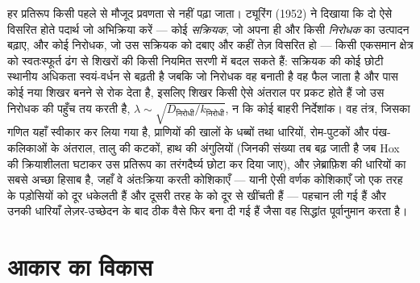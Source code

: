 \begin{proposition}[स्वतःस्फूर्त प्रतिरूप: ट्यूरिंग का तंत्र]\label{prop:b3:developmental-genetics:turing}
हर प्रतिरूप किसी पहले से मौजूद प्रवणता से नहीं पढ़ा जाता। ट्यूरिंग
(1952) ने दिखाया कि दो ऐसे विसरित होते पदार्थ जो अभिक्रिया करें ---
कोई \emph{सक्रियक}, जो अपना ही और किसी \emph{निरोधक} का उत्पादन बढ़ाए,
और कोई निरोधक, जो उस सक्रियक को दबाए और कहीं तेज़ विसरित हो --- किसी
एकसमान क्षेत्र को स्वतःस्फूर्त ढंग से शिखरों की किसी नियमित सरणी में
बदल सकते हैं: सक्रियक की कोई छोटी स्थानीय अधिकता स्वयं-वर्धन से बढ़ती
है जबकि जो निरोधक वह बनाती है वह फैल जाता है और पास कोई नया शिखर बनने
से रोक देता है, इसलिए शिखर किसी ऐसे अंतराल पर प्रकट होते हैं जो उस
निरोधक की पहुँच तय करती है,
$\lambda \sim \sqrt{D_{\text{निरोधी}}/k_{\text{निरोधी}}}$, न कि कोई बाहरी
निर्देशांक। वह तंत्र, जिसका गणित यहाँ स्वीकार कर लिया गया है, प्राणियों
की खालों के धब्बों तथा धारियों, रोम-पुटकों और पंख-कलिकाओं के अंतराल,
तालु की कटकों, हाथ की अंगुलियों (जिनकी संख्या तब बढ़ जाती है जब Hox की
क्रियाशीलता घटाकर उस प्रतिरूप का तरंगदैर्घ्य छोटा कर दिया जाए), और
ज़ेब्राफ़िश की धारियों का सबसे अच्छा हिसाब है, जहाँ वे अंतःक्रिया करती
कोशिकाएँ --- यानी ऐसी वर्णक कोशिकाएँ जो एक तरह के पड़ोसियों को दूर
धकेलती हैं और दूसरी तरह के को दूर से खींचती हैं --- पहचान ली गई हैं और
उनकी धारियाँ लेज़र-उच्छेदन के बाद ठीक वैसे फिर बना दी गई हैं जैसा वह
सिद्धांत पूर्वानुमान करता है।
\end{proposition}
\admitted

\section{आकार का विकास}

